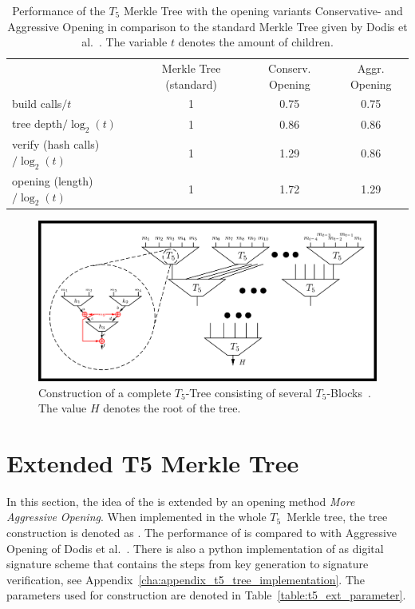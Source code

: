 \begin{table}
\centering
\begin{tabular}{l c c c} 
 \hline\noalign{\smallskip}
 \multicolumn{4}{c}{\textbf{$T_5$ Merkle Tree Performance}} \\
 \hline\noalign{\smallskip}
 & Merkle Tree (standard) & Conserv. Opening &  Aggr. Opening \\
 \hline\noalign{\smallskip}
 build calls$/t$ & 1 & 0.75 & 0.75 \\
 tree depth$/\log_2(t)$ & 1 & 0.86 & 0.86 \\
 verify (hash calls)$/\log_2(t)$ & 1 & 1.29 & 0.86 \\
 opening (length)$/\log_2(t)$ & 1 & 1.72 & 1.29 \\ 
 \hline
\end{tabular}
\caption{Performance of the $T_5$ Merkle Tree with the opening variants Conservative- and Aggressive Opening in comparison to the standard Merkle Tree given by Dodis et al.~\cite{T5_paper}. The variable $t$ denotes the amount of children.}
\label{table:t5_merkletree_dodis_performance}
\end{table}

\begin{figure}
\centering
\includegraphics[]{images/Methods/whole_tree_T5_paper.png}
\caption{Construction of a complete $T_5$-Tree consisting of several $T_5$-Blocks~\cite{T5_paper}. The value $H$ denotes the root of the tree.}
\label{img:t5_complete_tree_paper}
\end{figure}

\section{Extended T5 Merkle Tree}
\label{sec:ext_t5_tree} %
In this section, the idea of the \tftree is extended by an opening method \textit{More Aggressive Opening}. When implemented in the whole $T_5$~Merkle tree, the tree construction is denoted as \textit{\extree}.
The performance of \extree is compared to \tftree with Aggressive Opening of Dodis et al.~\cite{T5_paper}. There is also a python implementation of \extree as digital signature scheme that contains the steps from key generation to signature verification, see Appendix~\ref{cha:appendix_t5_tree_implementation}.
The parameters used for \extree construction are denoted in Table~\ref{table:t5_ext_parameter}.


